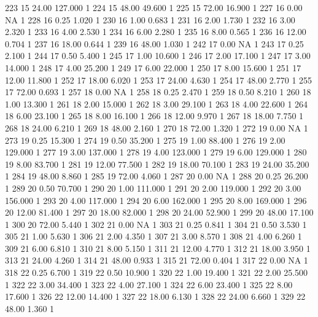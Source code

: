 \begin{Schunk}
\begin{Soutput}
223   15 24.00 127.000   1
224   15 48.00  49.600   1
225   15 72.00  16.900   1
227   16  0.00      NA   1
228   16  0.25   1.020   1
230   16  1.00   0.683   1
231   16  2.00   1.730   1
232   16  3.00   2.320   1
233   16  4.00   2.530   1
234   16  6.00   2.280   1
235   16  8.00   0.565   1
236   16 12.00   0.704   1
237   16 18.00   0.644   1
239   16 48.00   1.030   1
242   17  0.00      NA   1
243   17  0.25   2.100   1
244   17  0.50   5.400   1
245   17  1.00  10.600   1
246   17  2.00  17.100   1
247   17  3.00  14.000   1
248   17  4.00  25.200   1
249   17  6.00  22.000   1
250   17  8.00  15.600   1
251   17 12.00  11.800   1
252   17 18.00   6.020   1
253   17 24.00   4.630   1
254   17 48.00   2.770   1
255   17 72.00   0.693   1
257   18  0.00      NA   1
258   18  0.25   2.470   1
259   18  0.50   8.210   1
260   18  1.00  13.300   1
261   18  2.00  15.000   1
262   18  3.00  29.100   1
263   18  4.00  22.600   1
264   18  6.00  23.100   1
265   18  8.00  16.100   1
266   18 12.00   9.970   1
267   18 18.00   7.750   1
268   18 24.00   6.210   1
269   18 48.00   2.160   1
270   18 72.00   1.320   1
272   19  0.00      NA   1
273   19  0.25  15.300   1
274   19  0.50  35.200   1
275   19  1.00  88.400   1
276   19  2.00 129.000   1
277   19  3.00 137.000   1
278   19  4.00 123.000   1
279   19  6.00 129.000   1
280   19  8.00  83.700   1
281   19 12.00  77.500   1
282   19 18.00  70.100   1
283   19 24.00  35.200   1
284   19 48.00   8.860   1
285   19 72.00   4.060   1
287   20  0.00      NA   1
288   20  0.25  26.200   1
289   20  0.50  70.700   1
290   20  1.00 111.000   1
291   20  2.00 119.000   1
292   20  3.00 156.000   1
293   20  4.00 117.000   1
294   20  6.00 162.000   1
295   20  8.00 169.000   1
296   20 12.00  81.400   1
297   20 18.00  82.000   1
298   20 24.00  52.900   1
299   20 48.00  17.100   1
300   20 72.00   5.440   1
302   21  0.00      NA   1
303   21  0.25   0.841   1
304   21  0.50   3.530   1
305   21  1.00   5.630   1
306   21  2.00   4.350   1
307   21  3.00   8.570   1
308   21  4.00   6.260   1
309   21  6.00   6.810   1
310   21  8.00   5.150   1
311   21 12.00   4.770   1
312   21 18.00   3.950   1
313   21 24.00   4.260   1
314   21 48.00   0.933   1
315   21 72.00   0.404   1
317   22  0.00      NA   1
318   22  0.25   6.700   1
319   22  0.50  10.900   1
320   22  1.00  19.400   1
321   22  2.00  25.500   1
322   22  3.00  34.400   1
323   22  4.00  27.100   1
324   22  6.00  23.400   1
325   22  8.00  17.600   1
326   22 12.00  14.400   1
327   22 18.00   6.130   1
328   22 24.00   6.660   1
329   22 48.00   1.360   1

\end{Soutput}
\end{Schunk}
